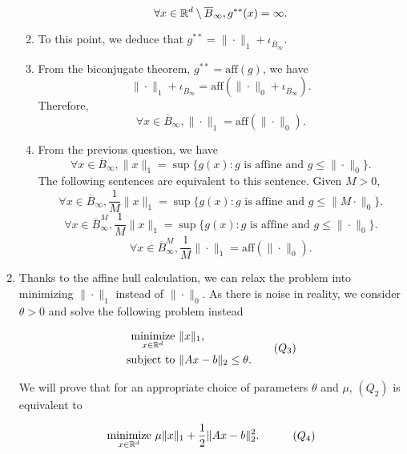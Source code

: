 \begin{enumerate}
\begin{enumerate}[label=(\alph*)]
                $$\forall x\in{\mathbb{R}}^d\setminus\overline{B}_{\infty}, g^{**}(x) = \infty.$$
          \item To this point, we deduce that $g^{**} = \|\cdot\|_1 + \iota_{\overline{B}_{\infty}}$.
          \item From the biconjugate theorem, $g^{**} = \mathrm{aff}(g)$, we have
                $$\|\cdot\|_1 + \iota_{\overline{B}_{\infty}} = \mathrm{aff}(\|\cdot\|_0 + \iota_{\overline{B}_{\infty}}).$$
                Therefore,
                $$\forall x\in\overline{B}_{\infty}, \|\cdot\|_1  = \mathrm{aff}(\|\cdot\|_0).$$
          \item From the previous question, we have
                $$\forall x\in\overline{B}_{\infty}, \|x\|_1 = \sup\{g(x) : g \text{ is affine and } g \le \|\cdot\|_0\}.$$
                The following sentences are equivalent to this sentence. Given $M > 0$,
                $$\forall x\in\overline{B}_{\infty}, \dfrac{1}{M}\|x\|_1 = \sup\{g(x) : g \text{ is affine and } g \le \|M\cdot\|_0\}.$$
                $$\forall x\in\overline{B}^M_{\infty}, \dfrac{1}{M}\|x\|_1 = \sup\{g(x) : g \text{ is affine and } g \le \|\cdot\|_0\}.$$
                $$\forall x\in\overline{B}^M_{\infty}, \dfrac{1}{M}\|\cdot\|_1 = \mathrm{aff}(\|\cdot\|_0).$$
        \end{enumerate}
  \item Thanks to the affine hull calculation, we can relax the problem into minimizing $\|\cdot\|_1$ instead of $\|\cdot\|_0$. As there is noise in reality, we consider $\theta > 0$ and solve the following problem instead

        \begin{equation}
          \begin{aligned}
            \operatorname*{minimize}\limits_{x\in{\mathbb{R}}^d} & \,\,\|x\|_1,                  \\
            \mathrm{subject \,\, to}     & \,\, \|Ax - b\|_2 \le \theta.
          \end{aligned}
          \tag{$Q_3$}
        \end{equation}

        We will prove that for an appropriate choice of parameters $\theta$ and $\mu$, $(Q_2)$ is equivalent to

        \begin{equation}
          \begin{aligned}
            \operatorname*{minimize}\limits_{x\in{\mathbb{R}}^d} & \,\,\mu\|x\|_1 + \dfrac{1}{2} \|Ax - b\|_2 ^2.
          \end{aligned}
          \tag{$Q_4$}
        \end{equation}


\end{enumerate}
